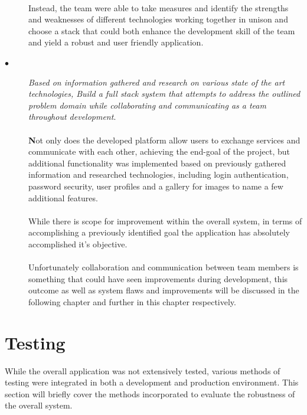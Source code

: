 \begin{description}
  \paragraph{}
  Instead, the team were able to take measures and identify the strengths and weaknesses of different technologies working together in unison and choose a stack that could both enhance the development skill of the team and yield a robust and user friendly application.
  
  \item[$\bullet$] \textit{Based on information gathered and research on various state of the art technologies, Build a full stack system that attempts to address the outlined problem domain while collaborating and communicating as a team throughout development}. 

  \paragraph{}
  \textbf{N}ot only does the developed platform allow users to exchange services and communicate with each other, achieving the end-goal of the project, but additional functionality was implemented based on previously gathered information and researched technologies, including login authentication, password security, user profiles and a gallery for images to name a few additional features.
  
  \paragraph{}
  While there is scope for improvement within the overall system, in terms of accomplishing a previously identified goal the application has absolutely accomplished it's objective. 
  
  \paragraph{}
  Unfortunately collaboration and communication between team members is something that could have seen improvements during development, this outcome as well as system flaws and improvements will be discussed in the following chapter and further in this chapter respectively.
\end{description}

\section{Testing}
While the overall application was not extensively tested, various methods of testing were integrated in both a development and production environment. This section will briefly cover the methods incorporated to evaluate the robustness of the overall system.

